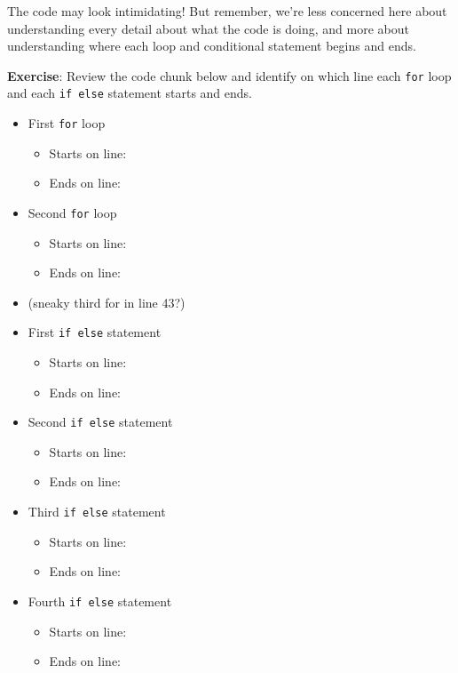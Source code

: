 \documentclass[
]{book}
\providecommand{\tightlist}{%
  \setlength{\itemsep}{0pt}\setlength{\parskip}{0pt}}
\begin{document}
The code may look intimidating! But remember, we're less concerned here about understanding every detail about what the code is doing, and more about understanding where each loop and conditional statement begins and ends.

\textbf{Exercise}: Review the code chunk below and identify on which line each \texttt{for} loop and each \texttt{if\ else} statement starts and ends.

\begin{itemize}
\item
  First \texttt{for} loop

  \begin{itemize}
  \tightlist
  \item
    Starts on line:
  \item
    Ends on line:
  \end{itemize}
\item
  Second \texttt{for} loop

  \begin{itemize}
  \tightlist
  \item
    Starts on line:
  \item
    Ends on line:
  \end{itemize}
\item
  (sneaky third for in line 43?)
\item
  First \texttt{if\ else} statement

  \begin{itemize}
  \tightlist
  \item
    Starts on line:
  \item
    Ends on line:
  \end{itemize}
\item
  Second \texttt{if\ else} statement

  \begin{itemize}
  \tightlist
  \item
    Starts on line:
  \item
    Ends on line:
  \end{itemize}
\item
  Third \texttt{if\ else} statement

  \begin{itemize}
  \tightlist
  \item
    Starts on line:
  \item
    Ends on line:
  \end{itemize}
\item
  Fourth \texttt{if\ else} statement

  \begin{itemize}
  \tightlist
  \item
    Starts on line:
  \item
    Ends on line:
  \end{itemize}
\end{itemize}
\end{document}
